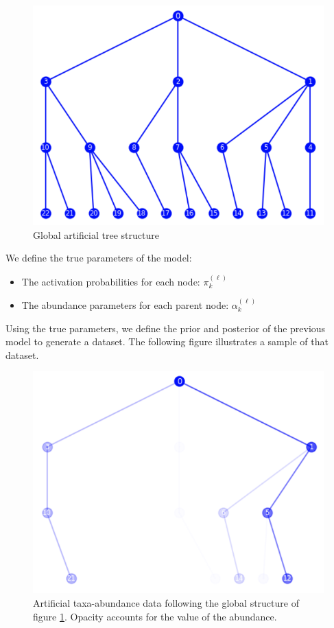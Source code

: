 \begin{figure}
    \centering
    \includegraphics[scale=0.7]{images/artificial_tree_global_structure}
    \caption{Global artificial tree structure}
    \label{fig:tree_artificial_architecture}
\end{figure}

We define the true parameters of the model:
\begin{itemize}[H]
    \item The activation probabilities for each node: $\pi_k^{(\ell)}$
    \item The abundance parameters for each parent node: $\alpha_k^{(\ell)}$
\end{itemize}

Using the true parameters, we define the prior and posterior of the previous model to generate a dataset.
The following figure illustrates a sample of that dataset.
\begin{figure}[H]
    \centering
    \includegraphics[scale=0.7]{images/artificial_tree_sample}
    \caption{Artificial taxa-abundance data following the global structure of figure \ref{fig:tree_artificial_architecture}.
    Opacity accounts for the value of the abundance.}
    \label{fig:tree_artificial_sample}
\end{figure}

